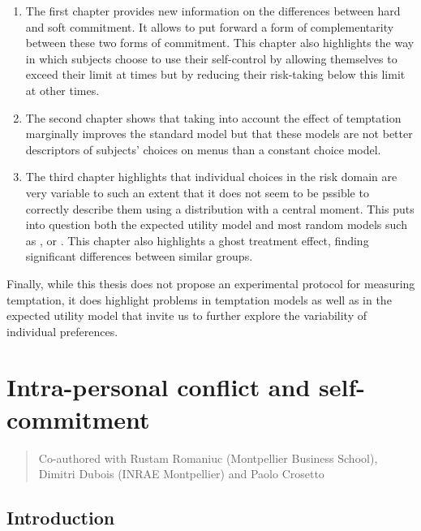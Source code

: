 \documentclass[
]{book}
\providecommand{\tightlist}{%
  \setlength{\itemsep}{0pt}\setlength{\parskip}{0pt}}
\begin{document}
\begin{enumerate}
\def\labelenumi{\arabic{enumi}.}
\tightlist
\item
  The first chapter provides new information on the differences between hard
  and soft commitment.
  It allows to put forward a form of complementarity between these two forms of
  commitment.
  This chapter also highlights the way in which subjects choose to use their
  self-control by allowing themselves to exceed their limit at times but by
  reducing their risk-taking below this limit at other times.
\item
  The second chapter shows that taking into account the effect of temptation
  marginally improves the standard model but that these models are not better
  descriptors of subjects' choices on menus than a constant choice model.
\item
  The third chapter highlights that individual choices in the risk domain are
  very variable to such an extent that it does not seem to be pssible to correctly describe them
  using a distribution with a central moment.
  This puts into question both the expected utility model and most random models
  such as \citet{gul2006random}, \citet{ratcliff2008diffusion} or \citet{cerreia2019deliberately}.
  This chapter also highlights a ghost treatment effect, finding significant
  differences between similar groups.
\end{enumerate}

Finally, while this thesis does not propose an experimental protocol for
measuring temptation, it does highlight problems in temptation models as well as
in the expected utility model that invite us to further explore the variability
of individual preferences.

\hypertarget{fdj}{%
\chapter{Intra-personal conflict and self-commitment}\label{fdj}}

\begin{quote}
Co-authored with Rustam Romaniuc (Montpellier Business School), Dimitri
Dubois (INRAE Montpellier) and Paolo Crosetto
\end{quote}

\hypertarget{intro2}{%
\section{Introduction}\label{intro2}}
\end{document}

